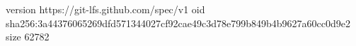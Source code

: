 version https://git-lfs.github.com/spec/v1
oid sha256:3a44376065269dfd571344027cf92cae49c3d78e799b849b4b9627a60cc0d9e2
size 62782
